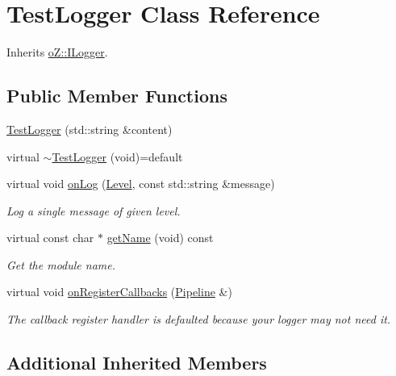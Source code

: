 \hypertarget{class_test_logger}{}\section{Test\+Logger Class Reference}
\label{class_test_logger}


Inherits \mbox{\hyperlink{classo_z_1_1_i_logger}{o\+Z\+::\+I\+Logger}}.

\subsection*{Public Member Functions}
\begin{DoxyCompactItemize}
\item 
\mbox{\hyperlink{class_test_logger_a001a08d4352b92db12ba738668c00acc}{Test\+Logger}} (std\+::string \&content)
\item 
virtual \mbox{\hyperlink{class_test_logger_a15d754f02edaf2ccc77d647864d02603}{$\sim$\+Test\+Logger}} (void)=default
\item 
virtual void \mbox{\hyperlink{class_test_logger_ae7b96502995c416dd4d4e7541f1ade80}{on\+Log}} (\mbox{\hyperlink{namespaceo_z_a72fc7662d5f07391ac6f0a5699014bfa}{Level}}, const std\+::string \&message)
\begin{DoxyCompactList}\small\item\em Log a single message of given level. \end{DoxyCompactList}\item 
virtual const char $\ast$ \mbox{\hyperlink{class_test_logger_a4e3ad3222ab7495cf30bb5b1a5270795}{get\+Name}} (void) const
\begin{DoxyCompactList}\small\item\em Get the module name. \end{DoxyCompactList}\item 
virtual void \mbox{\hyperlink{class_test_logger_a0ee94278a66b189ca55f04e40192b5d1}{on\+Register\+Callbacks}} (\mbox{\hyperlink{classo_z_1_1_pipeline}{Pipeline}} \&)
\begin{DoxyCompactList}\small\item\em The callback register handler is defaulted because your logger may not need it. \end{DoxyCompactList}\end{DoxyCompactItemize}
\subsection*{Additional Inherited Members}


